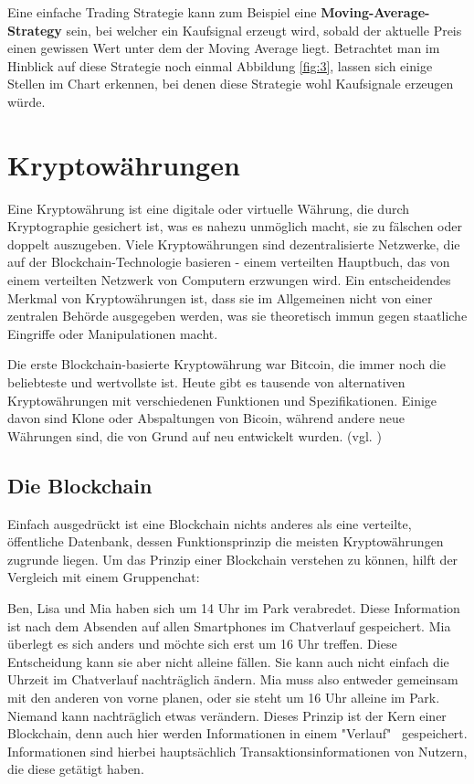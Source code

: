 \documentclass[oneside]{ausarbeitung}
\begin{document}
Eine einfache Trading Strategie kann zum Beispiel eine
\textbf{Moving-Average-Strategy} sein, bei welcher ein Kaufsignal
erzeugt wird, sobald der aktuelle Preis einen gewissen Wert unter dem
der Moving Average liegt. Betrachtet man im Hinblick auf diese
Strategie noch einmal Abbildung \ref{fig:3}, lassen sich einige
Stellen im Chart erkennen, bei denen diese Strategie wohl Kaufsignale
erzeugen würde. 


\section{Kryptowährungen}
\label{sec:kryptowährungen}

Eine Kryptowährung ist eine digitale oder virtuelle Währung, die
durch Kryptographie gesichert ist, was es nahezu unmöglich macht, sie
zu fälschen oder doppelt auszugeben. Viele Kryptowährungen sind
dezentralisierte Netzwerke, die auf der Blockchain-Technologie
basieren - einem verteilten Hauptbuch, das von einem verteilten
Netzwerk von Computern erzwungen wird. Ein entscheidendes Merkmal von
Kryptowährungen ist, dass sie im Allgemeinen nicht von einer
zentralen Behörde ausgegeben werden, was sie theoretisch immun gegen
staatliche Eingriffe oder Manipulationen macht.

Die erste Blockchain-basierte Kryptowährung war Bitcoin, die
immer noch die beliebteste und wertvollste ist. Heute gibt es tausende
von alternativen Kryptowährungen mit verschiedenen Funktionen und
Spezifikationen. Einige davon sind Klone oder Abspaltungen von Bicoin,
während andere neue Währungen sind, die von Grund auf neu entwickelt
wurden. (vgl. \cite{cryptocurrency_explained})

\subsection{Die Blockchain}
\label{sub:blockchain}

Einfach ausgedrückt ist eine Blockchain nichts anderes als eine
verteilte, öffentliche Datenbank\cite{blockchain_definition}, dessen
Funktionsprinzip die meisten Kryptowährungen zugrunde
liegen\cite{blockchain_1}.
Um das Prinzip einer Blockchain verstehen zu können, hilft der
Vergleich mit einem Gruppenchat:

Ben, Lisa und Mia haben sich um 14 Uhr im Park verabredet. Diese
Information ist nach dem Absenden auf allen Smartphones im Chatverlauf
gespeichert. Mia überlegt es sich anders und möchte sich erst um 16
Uhr treffen. Diese Entscheidung kann sie aber nicht alleine fällen.
Sie kann auch nicht einfach die Uhrzeit im Chatverlauf nachträglich
ändern. Mia muss also entweder gemeinsam mit den anderen von vorne
planen, oder sie steht um 16 Uhr alleine im Park. Niemand kann
nachträglich etwas verändern. Dieses Prinzip ist der Kern einer
Blockchain, denn auch hier werden Informationen in einem "Verlauf" \
gespeichert. Informationen sind hierbei hauptsächlich
Transaktionsinformationen von Nutzern, die diese getätigt haben.
\end{document}
